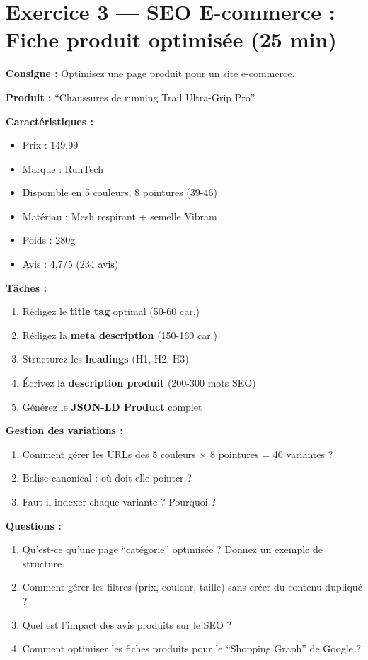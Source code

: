 \documentclass[12pt,a4paper]{report}
\begin{document}
\section{Exercice 3 --- SEO E-commerce : Fiche produit optimis\'{e}e (25 min)}

\textbf{Consigne :} Optimisez une page produit pour un site e-commerce.

\textbf{Produit :} ``Chaussures de running Trail Ultra-Grip Pro''

\textbf{Caract\'{e}ristiques :}
\begin{itemize}
    \item Prix : 149,99\,\texteuro{}
    \item Marque : RunTech
    \item Disponible en 5 couleurs, 8 pointures (39-46)
    \item Mat\'{e}riau : Mesh respirant + semelle Vibram
    \item Poids : 280g
    \item Avis : 4,7/5 (234 avis)
\end{itemize}

\textbf{T\^aches :}
\begin{enumerate}
    \item R\'{e}digez le \textbf{title tag} optimal (50-60 car.)
    \item R\'{e}digez la \textbf{meta description} (150-160 car.)
    \item Structurez les \textbf{headings} (H1, H2, H3)
    \item \'{E}crivez la \textbf{description produit} (200-300 mots SEO)
    \item G\'{e}n\'{e}rez le \textbf{JSON-LD Product} complet
\end{enumerate}

\textbf{Gestion des variations :}
\begin{enumerate}
    \item Comment g\'{e}rer les URLs des 5 couleurs $\times$ 8 pointures = 40 variantes ?
    \item Balise canonical : o\`{u} doit-elle pointer ?
    \item Faut-il indexer chaque variante ? Pourquoi ?
\end{enumerate}

\textbf{Questions :}
\begin{enumerate}
    \item Qu'est-ce qu'une page ``cat\'{e}gorie'' optimis\'{e}e ? Donnez un exemple de structure.
    \item Comment g\'{e}rer les filtres (prix, couleur, taille) sans cr\'{e}er du contenu dupliqu\'{e} ?
    \item Quel est l'impact des avis produits sur le SEO ?
    \item Comment optimiser les fiches produits pour le ``Shopping Graph'' de Google ?
\end{enumerate}
\end{document}
